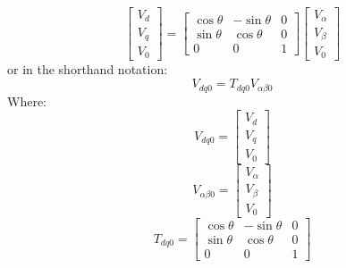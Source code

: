 \begin{equation*}
    \begin{bmatrix}
        V_d \\
        V_q \\
        V_0
    \end{bmatrix}
    =
    \begin{bmatrix}
        \cos \theta & -\sin \theta & 0 \\
        \sin \theta & \cos \theta  & 0 \\
        0           & 0            & 1
    \end{bmatrix}
    \begin{bmatrix}
        V_\alpha \\
        V_\beta  \\
        V_0
    \end{bmatrix}
\end{equation*}
\noindent
or in the shorthand notation:
\begin{equation*}
    V_{dq0} = T_{dq0} V_{\alpha\beta0}
\end{equation*}
\noindent
Where:
\begin{equation*}
    V_{dq0} = \begin{bmatrix}
        V_d \\
        V_q \\
        V_0
    \end{bmatrix}
\end{equation*}
\begin{equation*}
    V_{\alpha\beta0} = \begin{bmatrix}
        V_\alpha \\
        V_\beta  \\
        V_0
    \end{bmatrix}
\end{equation*}
\begin{equation*}
    T_{dq0} =
    \begin{bmatrix}
        \cos \theta & -\sin \theta & 0 \\
        \sin \theta & \cos \theta  & 0 \\
        0           & 0            & 1
    \end{bmatrix}
\end{equation*}
